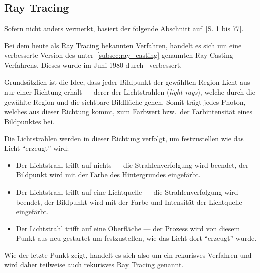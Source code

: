 \subsection{Ray Tracing}
\label{subsec:ray_tracing}

Sofern nicht anders vermerkt, basiert der folgende Abschnitt
auf~\cite{glassner_introduction_1989}[S. 1 bis 77].

Bei dem heute als Ray Tracing bekannten Verfahren, handelt es sich um
eine verbesserte Version des unter~\ref{subsec:ray_casting} genannten
Ray Casting Verfahrens. Dieses wurde im Juni 1980
durch~\citeauthor{whitted_improved_1980} verbessert.

Grundsätzlich ist die Idee, dass jeder Bildpunkt der gewählten Region
Licht aus nur einer Richtung erhält --- derer der Lichtstrahlen
(\textit{light rays}), welche durch die gewählte Region und die
sichtbare Bildfläche gehen. Somit trägt jedes Photon, welches aus dieser
Richtung kommt, zum Farbwert bzw.\ der Farbintensität eines Bildpunktes
bei.

Die Lichtstrahlen werden in dieser Richtung verfolgt, um festzustellen
wie das Licht ``erzeugt'' wird:
\begin{itemize}
    \item{Der Lichtstrahl trifft auf nichts} --- die Strahlenverfolgung
        wird beendet, der Bildpunkt wird mit der Farbe des Hintergrundes
        eingefärbt.
    \item{Der Lichtstrahl trifft auf eine Lichtquelle} --- die
        Strahlenverfolgung wird beendet, der Bildpunkt wird mit der
        Farbe und Intensität der Lichtquelle eingefärbt.
    \item{Der Lichtstrahl trifft auf eine Oberfläche} --- der Prozess
        wird von diesem Punkt aus neu gestartet um festzustellen, wie
        das Licht dort ``erzeugt'' wurde.
\end{itemize}

Wie der letzte Punkt zeigt, handelt es sich also um ein rekurisves Verfahren
und wird daher teilweise auch rekurisves Ray Tracing genannt.

